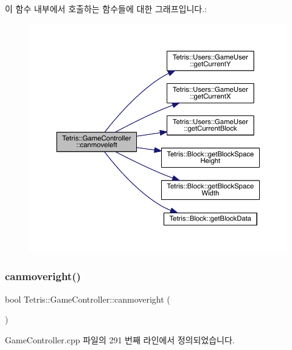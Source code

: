 이 함수 내부에서 호출하는 함수들에 대한 그래프입니다.\+:
\nopagebreak
\begin{figure}[H]
\begin{center}
\leavevmode
\includegraphics[width=350pt]{class_tetris_1_1_game_controller_ae541cf926ccdce47a185c94a0c80b642_cgraph}
\end{center}
\end{figure}
\mbox{\label{class_tetris_1_1_game_controller_a6c8189bb893502049396a7de1a73a88c}} 
\subsubsection{\texorpdfstring{canmoveright()}{canmoveright()}\hspace{0.1cm}{\footnotesize\ttfamily [1/2]}}
{\footnotesize\ttfamily bool Tetris\+::\+Game\+Controller\+::canmoveright (\begin{DoxyParamCaption}{ }\end{DoxyParamCaption})}



Game\+Controller.\+cpp 파일의 291 번째 라인에서 정의되었습니다.

